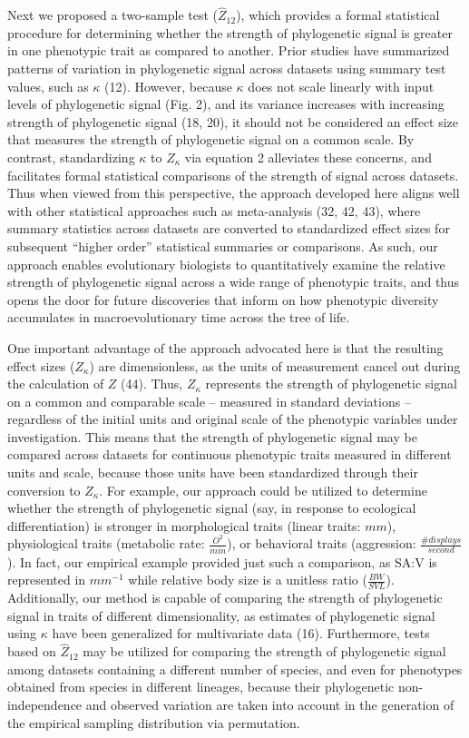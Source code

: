 \documentclass[9pt,twocolumn,twoside,lineno]{pnas-new}
\begin{document}
Next we proposed a two-sample test (\(\hat{Z}_{12}\)), which provides a
formal statistical procedure for determining whether the strength of
phylogenetic signal is greater in one phenotypic trait as compared to
another. Prior studies have summarized patterns of variation in
phylogenetic signal across datasets using summary test values, such as
\(\kappa\) (12). However, because \(\kappa\) does not scale linearly
with input levels of phylogenetic signal (Fig. 2), and its variance
increases with increasing strength of phylogenetic signal (18, 20), it
should not be considered an effect size that measures the strength of
phylogenetic signal on a common scale. By contrast, standardizing
\(\kappa\) to \(Z_\kappa\) via equation 2 alleviates these concerns, and
facilitates formal statistical comparisons of the strength of signal
across datasets. Thus when viewed from this perspective, the approach
developed here aligns well with other statistical approaches such as
meta-analysis (32, 42, 43), where summary statistics across datasets are
converted to standardized effect sizes for subsequent ``higher order''
statistical summaries or comparisons. As such, our approach enables
evolutionary biologists to quantitatively examine the relative strength
of phylogenetic signal across a wide range of phenotypic traits, and
thus opens the door for future discoveries that inform on how phenotypic
diversity accumulates in macroevolutionary time across the tree of life.

One important advantage of the approach advocated here is that the
resulting effect sizes (\(Z_\kappa\)) are dimensionless, as the units of
measurement cancel out during the calculation of \(Z\) (44). Thus,
\(Z_\kappa\) represents the strength of phylogenetic signal on a common
and comparable scale -- measured in standard deviations -- regardless of
the initial units and original scale of the phenotypic variables under
investigation. This means that the strength of phylogenetic signal may
be compared across datasets for continuous phenotypic traits measured in
different units and scale, because those units have been standardized
through their conversion to \(Z_\kappa\). For example, our approach
could be utilized to determine whether the strength of phylogenetic
signal (say, in response to ecological differentiation) is stronger in
morphological traits (linear traits: \(mm\)), physiological traits
(metabolic rate: \(\frac{O^2}{min}\)), or behavioral traits (aggression:
\(\frac{\#{displays}}{second}\)). In fact, our empirical example
provided just such a comparison, as SA:V is represented in \(mm^{-1}\)
while relative body size is a unitless ratio (\(\frac{BW}{SVL}\)).
Additionally, our method is capable of comparing the strength of
phylogenetic signal in traits of different dimensionality, as estimates
of phylogenetic signal using \(\kappa\) have been generalized for
multivariate data (16). Furthermore, tests based on \(\hat{Z}_{12}\) may
be utilized for comparing the strength of phylogenetic signal among
datasets containing a different number of species, and even for
phenotypes obtained from species in different lineages, because their
phylogenetic non-independence and observed variation are taken into
account in the generation of the empirical sampling distribution via
permutation.
\end{document}
